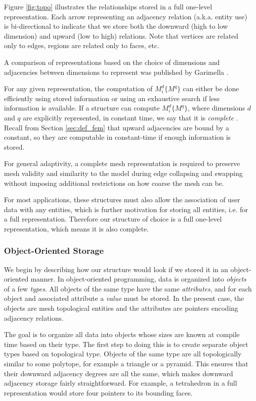 Figure \ref{fig:topo} illustrates the relationships
stored in a full one-level representation.
Each arrow representing an adjacency relation (a.k.a. entity use)
is bi-directional to indicate that we store both the
downward (high to low dimension) and upward (low to high) relations.
Note that vertices are related only to edges,
regions are related only to faces, etc.

A comparison of representations based on the choice
of dimensions and adjacencies between
dimensions to represent
was published by Garimella \cite{garimella2002mesh}.

For any given representation, the computation of $M^d_i\{M^q\}$
can either be done efficiently using stored information
or using an exhaustive search if less information is available.
If a structure can compute $M^d_i\{M^q\}$, where dimensions
$d$ and $q$ are explicitly represented, in constant time,
we say that it is {\it complete} \cite{seol2006efficient}.
Recall from Section \ref{sec:def_fem} that upward adjacencies
are bound by a constant, so they are computable in
constant-time if enough information is stored.

For general adaptivity,
a complete mesh representation is required to preserve mesh
validity and similarity to the model during edge
collapsing and swapping without imposing additional
restrictions on how coarse the mesh can be.

For most applications, these structures
must also allow the association of user data with any
entities, which is further motivation for storing
all entities, i.e. for a full representation.
Therefore our structure of choice is a full
one-level representation, which means it is also complete.

\subsubsection{Object-Oriented Storage}
\label{sec:sisc_oo}

We begin by describing how our structure would look
if we stored it in an object-oriented manner.
In object-oriented programming, data is organized
into {\it objects} of a few {\it types}.
All objects of the same type have the same {\it attributes},
and for each object and associated attribute a {\it value} must be stored.
In the present case, the objects are mesh topological entities
and the attributes are pointers encoding adjacency relations.

The goal is to organize all data into objects whose
sizes are known at compile time based on their type.
The first step to doing this is to create separate object types
based on topological type.
Objects of the same type are all topologically similar to some polytope,
for example a triangle or a pyramid.
This ensures that their downward adjacency degrees are all the same,
which makes downward adjacency storage fairly straightforward.
For example, a tetrahedron in a full representation would store
four pointers to its bounding faces.

